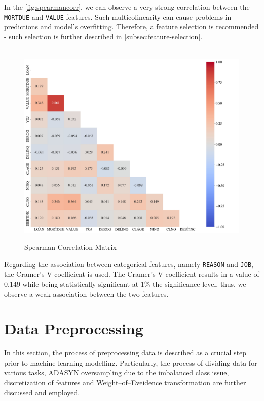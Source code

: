 In the \autoref{fig:spearmancorr}, we can observe a very strong correlation between the \texttt{MORTDUE} and \texttt{VALUE} features. Such multicolinearity can cause problems in predictions and model's overfitting. Therefore, a feature selection is recommended - such selection is further described in \autoref{subsec:feature-selection}.
\begin{figure}[H]
    \centering
    \caption{Spearman Correlation Matrix}\vspace{0.5em}
    \label{fig:spearmancorr}\
    \includegraphics[width=150mm]{Figures/Spearman_Correlation_Matrix_Numeric_Features.jpg}

    \vspace{-1em}
\end{figure}

Regarding the association between categorical features, namely \texttt{REASON} and \texttt{JOB}, the Cramer's V coefficient is used. The Cramer's V coefficient results in a value of 0.149 while being statistically significant at 1\% the significance level, thus, we observe a weak association between the two features.


\newpage
\section{Data Preprocessing}
\label{sec:dataprep}
In this section, the process of preprocessing data is described as a crucial step prior to machine learning modelling. Particularly, the process of dividing data for various tasks, ADASYN oversampling due to the imbalanced class issue, discretization of features and Weight--of--Eveidence transformation are further discussed and employed.

